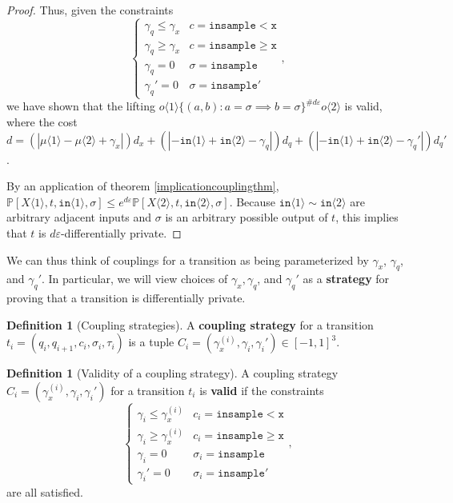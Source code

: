 \documentclass[12pt]{article}
\newcommand{\PP}{\mathbb{P}}
\newcommand{\gguard}[1][x]{\texttt{insample}\geq #1}
\newcommand{\lguard}[1][x]{\texttt{insample} < #1}
\newcommand{\brangle}[1]{\langle #1 \rangle}
\theoremstyle{definition}
\newtheorem{defn}[thm]{Definition}
\begin{document}
\begin{proof}
Thus, given the constraints \[
  \begin{cases}
    \gamma_q\leq\gamma_x & c = \lguard[\texttt{x}]\\
    \gamma_q\geq\gamma_x & c = \gguard[\texttt{x}]\\
    \gamma_q=0 & \sigma = \texttt{insample}\\
    \gamma_q'=0 & \sigma = \texttt{insample}'
  \end{cases},
\]
we have shown that the lifting $o\brangle{1}\{(a, b): a=\sigma\implies b=\sigma\}^{\#d\varepsilon}o\brangle{2}$ is valid, where the cost $d = (|\mu\brangle{1}-\mu\brangle{2}+\gamma_x|)d_x+(|-\texttt{in}\brangle{1}+\texttt{in}\brangle{2}-\gamma_q|)d_q+(|-\texttt{in}\brangle{1}+\texttt{in}\brangle{2}-\gamma_q'|)d_q'$. 

By an application of theorem \ref{implicationcouplingthm}, $\PP[X\brangle{1}, t, \texttt{in}\brangle{1}, \sigma]\leq e^{d\varepsilon}\PP[X\brangle{2}, t, \texttt{in}\brangle{2}, \sigma]$. Because $\texttt{in}\brangle{1}\sim\texttt{in}\brangle{2}$ are arbitrary adjacent inputs and $\sigma$ is an arbitrary possible output of $t$, this implies that $t$ is $d\varepsilon$-differentially private. 
\end{proof}

We can thus think of couplings for a transition as being parameterized by $\gamma_x$, $\gamma_q$, and $\gamma_q'$. In particular, we will view choices of $\gamma_x, \gamma_q$, and $\gamma_q'$ as a \textbf{strategy} for proving that a transition is differentially private. 

\begin{defn}[Coupling strategies]
    A \textbf{coupling strategy} for a transition $t_i = (q_i, q_{i+1}, c_i, \sigma_i, \tau_i)$ is a tuple $C_i = (\gamma_x^{(i)}, \gamma_i, \gamma_i')\in [-1, 1]^3$. 
\end{defn}

\begin{defn}[Validity of a coupling strategy]
    A coupling strategy $C_i =(\gamma_x^{(i)}, \gamma_i, \gamma_i')$ for a transition $t_i$ is \textbf{valid} if the constraints \[
        \begin{cases}
          \gamma_i\leq\gamma_x^{(i)} & c_i = \lguard[\texttt{x}]\\
          \gamma_i\geq\gamma_x^{(i)} & c_i = \gguard[\texttt{x}]\\
          \gamma_i=0 & \sigma_i = \texttt{insample}\\
          \gamma_i'=0 & \sigma_i = \texttt{insample}'
        \end{cases},
      \]
      are all satisfied. 
\end{defn}
\end{document}
